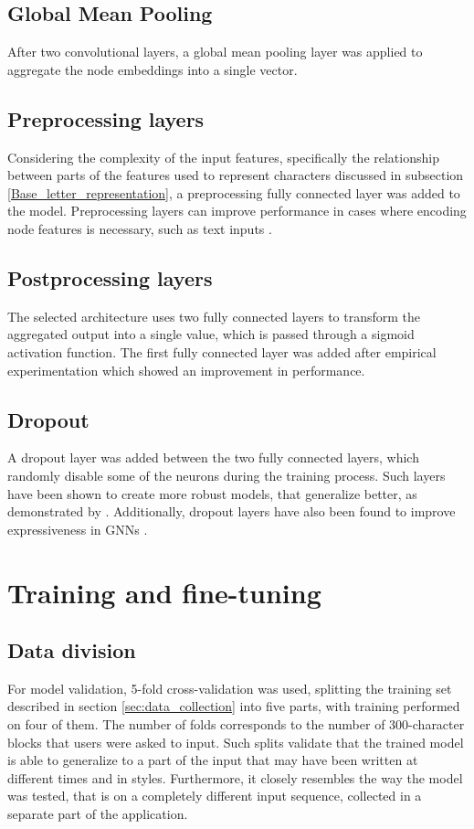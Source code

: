 \subsection{Global Mean Pooling}
After two convolutional layers, a global mean pooling layer was applied to aggregate the node embeddings into a single vector. 


\subsection{Preprocessing layers}
Considering the complexity of the input features, specifically the relationship between parts of the features used to represent characters discussed in subsection \ref{Base_letter_representation}, a preprocessing fully connected layer was added to the model. Preprocessing layers can improve performance in cases where encoding node features is necessary, such as text inputs \cite{Lesk2024}.

\subsection{Postprocessing layers}
The selected architecture uses two fully connected layers to transform the aggregated output into a single value, 
which is passed through a sigmoid activation function. The first fully connected layer was added after empirical experimentation which showed an improvement in performance.


\subsection{Dropout}
A dropout layer was added between the two fully connected layers, which randomly disable some of the neurons during the training process. Such layers have been shown to create more robust models, that generalize better, as demonstrated by \cite{NIPS2013_71f6278d}. Additionally, dropout layers have also been found to improve expressiveness in GNNs \cite{NEURIPS2021_b8b2926b}.

\section{Training and fine-tuning}

\subsection{Data division}
For model validation, 5-fold cross-validation was used, splitting the training set described in section \ref{sec:data_collection} into five parts, with training performed on four of them. The number of folds corresponds to the number of 300-character blocks that users were asked to input. Such splits validate that the trained model is able to generalize to a part of the input that may have been written at different times and in styles. Furthermore, it closely resembles the way the model was tested, that is on a completely different input sequence, collected in a separate part of the application.  

